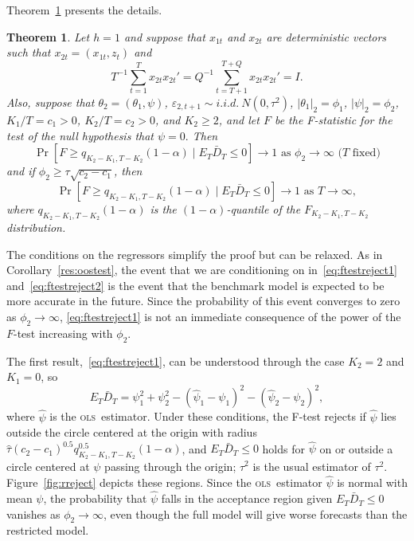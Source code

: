 \documentclass[11pt]{article}
\newtheorem{thm}{Theorem}[section]
\newcommand{\oosB}{\bar{D}_{T}}
\newcommand{\h}{h}
\newcommand{\ols}{\textsc{ols}}
\begin{document}
Theorem~\ref{res:ftest} presents the details.
\begin{thm}\label{res:ftest}
  Let $\h = 1$ and suppose that $x_{1t}$ and $x_{2t}$ are
  deterministic vectors such that $x_{2t} = (x_{1t}, z_t)$ and
\[
T^{-1} \sum_{t=1}^T x_{2t} x_{2t}'  = Q^{-1} \sum_{t=T+1}^{T+Q} x_{2t} x_{2t}' =
I.
\]
Also, suppose that $\theta_2 = (\theta_1, \psi)$, 
$\varepsilon_{2,t+1} \sim i.i.d.\ N(0,\tau^2)$,
$|\theta_1|_2 = \phi_1$, $|\psi|_2 = \phi_2$, $K_1/T = c_1 > 0$,
$K_2/T = c_2 > 0$, and $K_2 \geq 2$, and let $F$ be the F-statistic
for the test of the null hypothesis that $\psi = 0.$
Then 
\begin{equation}\label{eq:ftestreject1}
  \Pr[F \geq q_{K_2 - K_1, T - K_2}(1-\alpha) \mid E_T \oosB \leq 0
  ] \to 1\mbox{ as $\phi_2 \to \infty$ ($T$ fixed)}
\end{equation}
and if $\phi_2 \geq \tau \sqrt{c_2 - c_1}$, then
\begin{equation}\label{eq:ftestreject2}
  \Pr[F \geq q_{K_2 - K_1, T - K_2}(1-\alpha) \mid E_T \oosB \leq 0
  ] \to 1 \text{ as $T \to \infty$},
\end{equation}
where $q_{K_2-K_1, T-K_2}(1-\alpha)$ is the
$(1-\alpha)$-quantile of the $F_{K_2-K_1, T-K_2}$ distribution.
\end{thm}
The conditions on the regressors simplify the proof but can be
relaxed.  As in Corollary~\ref{res:oostest}, the event that we are
conditioning on in~\eqref{eq:ftestreject1} and~\eqref{eq:ftestreject2}
is the event that the benchmark model is expected to be more accurate
in the future.  Since the probability of this event converges to zero
as $\phi_2 \to \infty$, \eqref{eq:ftestreject1} is not an immediate
consequence of the power of the $F$-test increasing with $\phi_2$.

The first result,~\eqref{eq:ftestreject1}, can be understood through
the case $K_2 = 2$ and $K_1 = 0$, so
\begin{equation*}
  E_T \oosB = \psi_1^2 + \psi_2^2 - (\hat{\psi}_1 - \psi_1)^2 - (\hat\psi_2 - \psi_2)^2,
\end{equation*}
where $\hat{\psi}$ is the \ols\ estimator.  Under these conditions,
the F-test rejects if $\hat{\psi}$ lies outside the circle centered at
the origin with radius $\hat{\tau} (c_2 - c_1)^{0.5} q_{K_2-K_1,
  T-K_2}^{0.5}(1-\alpha)$, and $E_T \oosB \leq 0$ holds for $\hat\psi$
on or outside a circle centered at $\psi$ passing through the origin;
$\hat{\tau}^2$ is the usual estimator of $\tau^2$.
Figure~\ref{fig:rreject} depicts these regions.  Since the \ols\
estimator $\hat\psi$ is normal with mean $\psi$, the probability that
$\hat{\psi}$ falls in the acceptance region given $E_T \oosB \leq 0$
vanishes as $\phi_2 \to \infty$, even though the full model will give
worse forecasts than the restricted model.
\end{document}
